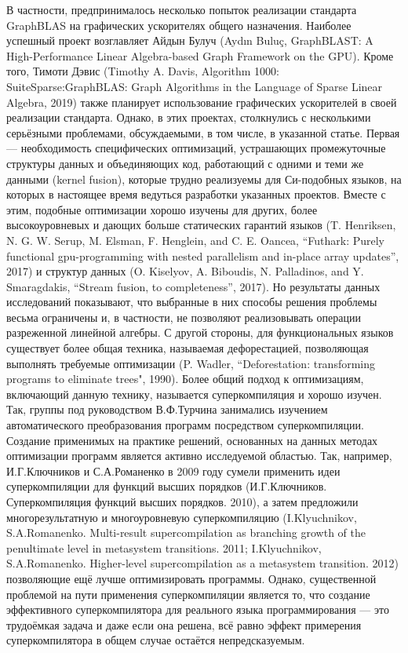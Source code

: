 \documentclass[12pt]{article}  %
\theoremstyle{remark}
\begin{document}
В частности, предпринималось несколько попыток реализации стандарта GraphBLAS на графических ускорителях общего назначения. Наиболее успешный проект возглавляет Айдын Булуч (Aydın Buluç, GraphBLAST: A High-Performance Linear Algebra-based Graph Framework on the GPU). Кроме того, Тимоти Дэвис (Timothy A. Davis, Algorithm 1000: SuiteSparse:GraphBLAS: Graph Algorithms in the Language of Sparse Linear Algebra, 2019) также планирует использование графических ускорителей в своей реализации стандарта. Однако, в этих проектах,  столкнулись с несколькими серьёзными проблемами, обсуждаемыми, в том числе, в указанной статье. Первая --- необходимость специфических оптимизаций, устрашающих промежуточные структуры данных и объединяющих код, работающий с одними и теми же данными (kernel fusion), которые трудно реализуемы для Си-подобных языков, на которых в настоящее время ведуться разработки указанных проектов. Вместе с этим, подобные оптимизации хорошо изучены для других, более высокоуровневых и дающих больше статических гарантий языков (T. Henriksen, N. G. W. Serup, M. Elsman, F. Henglein, and C. E. Oancea, “Futhark: Purely functional gpu-programming with nested parallelism and in-place array updates”, 2017) и структур данных (O. Kiselyov, A. Biboudis, N. Palladinos, and Y. Smaragdakis, “Stream fusion, to completeness”, 2017). Но результаты данных исследований показывают, что выбранные в них способы решения проблемы весьма ограничены и, в частности, не позволяют реализовывать операции разреженной линейной алгебры. С другой стороны, для функциональных языков существует более общая техника, называемая 	дефорестацией, позволяющая выполнять требуемые оптимизации (P. Wadler, “Deforestation: transforming programs to eliminate trees", 1990). Более общий подход к оптимизациям, включающий данную технику, называется суперкомпиляция и хорошо изучен. Так, группы под руководством В.Ф.Турчина занимались изучением автоматического преобразования программ посредством суперкомпиляции. Создание применимых на практике решений, основанных на данных методах оптимизации программ является активно исследуемой областью. Так, например, И.Г.Ключников и С.А.Романенко в 2009 году сумели применить идеи суперкомпиляции для функций высших порядков (И.Г.Ключников. Суперкомпиляция функций высших порядков. 2010), а затем предложили многорезультатную и многоуровневую суперкомпиляцию (I.Klyuchnikov, S.A.Romanenko. Multi-result supercompilation as branching growth of the penultimate level in metasystem transitions. 2011; I.Klyuchnikov, S.A.Romanenko. Higher-level supercompilation as a metasystem transition. 2012) позволяющие ещё лучше оптимизировать программы. Однако, существенной проблемой на пути применения суперкомпиляции является то, что создание эффективного суперкомпилятора для реального языка программирования --- это трудоёмкая задача и даже если она решена, всё равно эффект примерения суперкомпилятора в общем случае остаётся непредсказуемым. 
\end{document}
